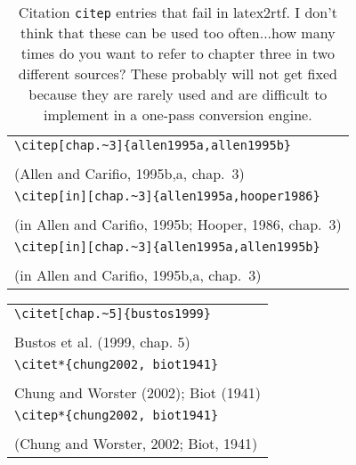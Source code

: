 \documentclass{article}
\begin{document}
\begin{table}
\begin{center}
\begin{tabular}{l}
	\verb#\citep[chap.~3]{allen1995a,allen1995b}# \\
	\citep[chap.~3]{allen1995a,allen1995b} \\
	(Allen and Carifio, 1995b,a, chap.~3) \\
\hline
	\verb#\citep[in][chap.~3]{allen1995a,hooper1986}# \\
	\citep[in][chap.~3]{allen1995a,hooper1986} \\
	(in Allen and Carifio, 1995b; Hooper, 1986, chap.~3)\\
\hline
	\verb#\citep[in][chap.~3]{allen1995a,allen1995b}# \\
	\citep[in][chap.~3]{allen1995a,allen1995b} \\
	(in Allen and Carifio, 1995b,a, chap.~3)\\
\end{tabular}
\end{center}
\caption{Citation \texttt{citep} entries that fail in latex2rtf.  I don't think
that these can be used too often...how many times do you want to refer to chapter
three in two different sources?  These probably will not get fixed because they
are rarely used and are difficult to implement in a one-pass conversion engine.}
\end{table}

\begin{center}
\begin{tabular}{l}
\verb#\citet[chap.~5]{bustos1999}#\\
\citet[chap.~5]{bustos1999}\\
Bustos et al. (1999, chap. 5)\\
\hline 
\verb#\citet*{chung2002, biot1941}#\\
\citet*{chung2002, biot1941}\\
Chung and Worster (2002); Biot (1941)\\
\hline
\verb#\citep*{chung2002, biot1941}#\\
\citep*{chung2002, biot1941}\\
(Chung and Worster, 2002; Biot, 1941)\\
\end{tabular}
\end{center}
\end{document}
